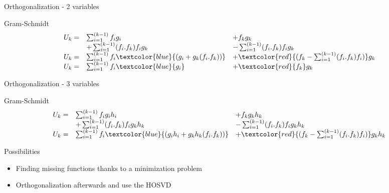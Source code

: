 \documentclass[12pt]{beamer}
\newcommand\FontPOD{\fontsize{10}{12}\selectfont}
\begin{document}
\begin{frame}{Orthogonalization - 2 variables}
\begin{figure}[t]
	\vspace{-0.6cm}
	\end{figure}
	\centering
	   \begin{minipage}{1\linewidth}
			\begin{exampleblock}{Gram-Schmidt}
				\vspace{-0.4cm}
				\[
				\begin{array}{l l l}
				U_k =	& \sum_{i=1}^{(k-1)}  f_i g_i &+ f_k g_k\\
							& + \sum_{i=1}^{(k-1)}  (f_i.f_k) f_i g_k &- \sum_{i=1}^{(k-1)}  (f_i.f_k) f_i g_k\\
				U_k = & \sum_{i=1}^{(k-1)} f_i \textcolor{blue}{(g_i+g_k(f_i.f_k))} &+ \textcolor{red}{(f_k-\sum_{i=1}^{(k-1)}(f_i.f_k)f_i )}g_k\\
				U_k =	& \sum_{i=1}^{(k-1)}  f_i \textcolor{blue}{g_i} &+ \textcolor{red}{f_k} g_k\\
				\end{array}
				\]
				\vspace{-0.3cm}
			\end{exampleblock}
	   \end{minipage}
\end{frame}


\begin{frame}{Orthogonalization - 3 variables}
\FontPOD

	\centering
	   \begin{minipage}{1\linewidth}
			\begin{exampleblock}{Gram-Schmidt}
				\vspace{-0.6cm}
				\[
				\begin{array}{l l l}
				U_k =	& \sum_{i=1}^{(k-1)}  f_i g_i h_i &+ f_k g_k h_k\\
							& + \sum_{i=1}^{(k-1)}  (f_i.f_k) f_i g_k h_k &- \sum_{i=1}^{(k-1)}  (f_i.f_k) f_i g_k h_k\\
				U_k = & \sum_{i=1}^{(k-1)} f_i \textcolor{blue}{(g_i h_i+g_k h_k(f_i.f_k))} 
								&+ \textcolor{red}{(f_k-\sum_{i=1}^{(k-1)}(f_i.f_k)f_i )}g_k h_k\\
				\end{array}
				\]
				\vspace{-0.3cm}
			\end{exampleblock}
	   \end{minipage}
	   
	\centering
	   \begin{minipage}{0.9\linewidth}
			\begin{exampleblock}{Possibilities}
				\begin{itemize}
				 	\item Finding missing functions thanks to a minimization problem
				 	\item Orthogonalization afterwards and use the HOSVD
				\end{itemize}
			\end{exampleblock}
	   \end{minipage}
\end{frame}
\end{document}
